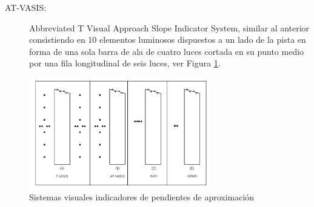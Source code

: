 \begin{description}
\item[AT-VASIS:] Abbreviated T Visual Approach Slope Indicator System, similar al anterior 
consistiendo en 10 elementos luminosos dispuestos a un lado de la pista en forma de una sola barra
de ala de cuatro luces cortada en su punto medio por una fila longitudinal de seis luces,
ver Figura \ref{fig:06.sistemas.indicadores.pendiente.aproximacion}.

\end{description}

\begin{figure}[!htb]
  \centering
  \includegraphics[width=0.7\textwidth]{06.radionavegacion/Imagenes/06.VASIS/06-TVasis+AT-Vasis+Papi+Apapi.pdf}
  \caption{ Sistemas visuales indicadores de pendientes de aproximación \protect\cite{Anexo14Vol1}}
  \label{fig:06.sistemas.indicadores.pendiente.aproximacion}
\end{figure}

